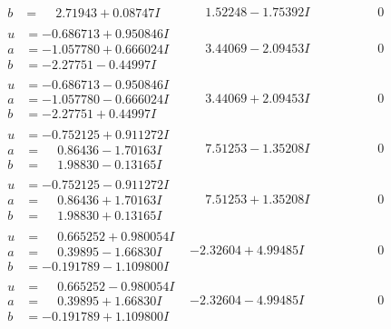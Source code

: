 \documentclass[1p]{elsarticle_modified}
\theoremstyle{definition}
\begin{document}
$$\begin{array}{c|c|c}
\begin{aligned}
b &= \phantom{-}2.71943 + 0.08747 I\end{aligned}
 & \phantom{-}1.52248 - 1.75392 I & \phantom{-0.000000 } 0 \\ \hline\begin{aligned}
u &= -0.686713 + 0.950846 I \\
a &= -1.057780 + 0.666024 I \\
b &= -2.27751 - 0.44997 I\end{aligned}
 & \phantom{-}3.44069 - 2.09453 I & \phantom{-0.000000 } 0 \\ \hline\begin{aligned}
u &= -0.686713 - 0.950846 I \\
a &= -1.057780 - 0.666024 I \\
b &= -2.27751 + 0.44997 I\end{aligned}
 & \phantom{-}3.44069 + 2.09453 I & \phantom{-0.000000 } 0 \\ \hline\begin{aligned}
u &= -0.752125 + 0.911272 I \\
a &= \phantom{-}0.86436 - 1.70163 I \\
b &= \phantom{-}1.98830 - 0.13165 I\end{aligned}
 & \phantom{-}7.51253 - 1.35208 I & \phantom{-0.000000 } 0 \\ \hline\begin{aligned}
u &= -0.752125 - 0.911272 I \\
a &= \phantom{-}0.86436 + 1.70163 I \\
b &= \phantom{-}1.98830 + 0.13165 I\end{aligned}
 & \phantom{-}7.51253 + 1.35208 I & \phantom{-0.000000 } 0 \\ \hline\begin{aligned}
u &= \phantom{-}0.665252 + 0.980054 I \\
a &= \phantom{-}0.39895 - 1.66830 I \\
b &= -0.191789 - 1.109800 I\end{aligned}
 & -2.32604 + 4.99485 I & \phantom{-0.000000 } 0 \\ \hline\begin{aligned}
u &= \phantom{-}0.665252 - 0.980054 I \\
a &= \phantom{-}0.39895 + 1.66830 I \\
b &= -0.191789 + 1.109800 I\end{aligned}
 & -2.32604 - 4.99485 I & \phantom{-0.000000 } 0 \\ \hline\begin{aligned}

\end{aligned}
\end{array}$$
\end{document}
